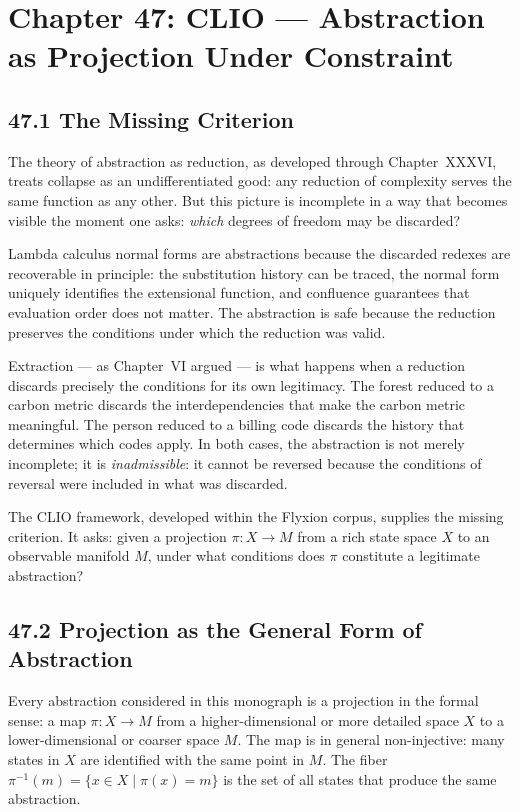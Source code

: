 \documentclass[12pt,letterpaper]{article}
\theoremstyle{remark}
\begin{document}
\newpage
\section{Chapter 47: CLIO — Abstraction as Projection Under Constraint}

\subsection{47.1 The Missing Criterion}

The theory of abstraction as reduction, as developed through
Chapter~XXXVI, treats collapse as an undifferentiated good: any
reduction of complexity serves the same function as any other.
But this picture is incomplete in a way that becomes visible the
moment one asks: \emph{which} degrees of freedom may be discarded?

Lambda calculus normal forms are abstractions because the discarded
redexes are recoverable in principle: the substitution history can
be traced, the normal form uniquely identifies the extensional
function, and confluence guarantees that evaluation order does not
matter. The abstraction is safe because the reduction preserves the
conditions under which the reduction was valid.

Extraction — as Chapter~VI argued — is what happens when a reduction
discards precisely the conditions for its own legitimacy. The forest
reduced to a carbon metric discards the interdependencies that make
the carbon metric meaningful. The person reduced to a billing code
discards the history that determines which codes apply. In both
cases, the abstraction is not merely incomplete; it is
\emph{inadmissible}: it cannot be reversed because the conditions
of reversal were included in what was discarded.

The CLIO framework, developed within the Flyxion corpus, supplies
the missing criterion. It asks: given a projection $\pi: X \to M$
from a rich state space $X$ to an observable manifold $M$, under
what conditions does $\pi$ constitute a legitimate abstraction?

\subsection{47.2 Projection as the General Form of Abstraction}

Every abstraction considered in this monograph is a projection in
the formal sense: a map $\pi: X \to M$ from a higher-dimensional
or more detailed space $X$ to a lower-dimensional or coarser space
$M$. The map is in general non-injective: many states in $X$ are
identified with the same point in $M$. The fiber $\pi^{-1}(m) =
\{x \in X \mid \pi(x) = m\}$ is the set of all states that produce
the same abstraction.
\end{document}
